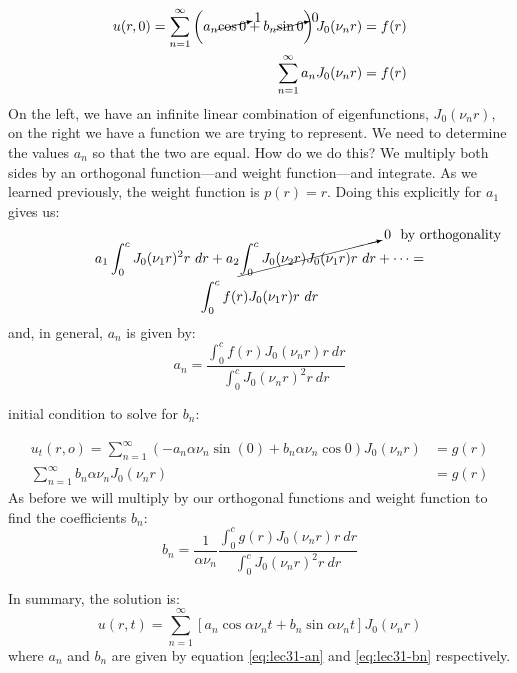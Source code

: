 \begin{align*}
u(r,0) = \sum\limits_{n=1}^{\infty} \left(a_n \cancelto{1}{\cos{0}} + b_n \cancelto{0}{\sin{0}}\right) J_0(\nu_n r) &= f(r) \\
\sum\limits_{n=1}^{\infty}a_nJ_0(\nu_n r) &= f(r)
\end{align*}
On the left, we have an infinite linear combination of eigenfunctions, $J_0(\nu_n r)$, on the right we have a function we are trying to represent.  We need to determine the values $a_n$ so that the two are equal.  How do we do this?  We multiply both sides by an orthogonal function---and weight function---and integrate.  As we learned previously, the weight function is $p(r) = r$.  Doing this explicitly for $a_1$ gives us:
\begin{multline*}
a_1 \int_0^c J_0(\nu_1r)^2 r \ dr + a_2 \cancelto{0 \ \text{ by orthogonality}}{\int_0^c J_0(\nu_2r)J_0(\nu_1 r)r \ dr} + \cdots = \\ \int_0^c f(r)J_0(\nu_1r) r \ dr
\end{multline*}
and, in general, $a_n$ is given by:
\begin{equation}
a_n = \frac{\int_0^c f(r)J_0(\nu_n r) r \ dr}{\int_0^c J_0(\nu_n r)^2 r \ dr}
\label{eq:lec31-an}
\end{equation}

 initial condition to solve for $b_n$:

\begin{align*}
u_t(r,o) = \sum\limits_{n=1}^{\infty}\left(-a_n \alpha \nu_n \sin(0) + b_n \alpha \nu_n \cos{0} \right)J_0(\nu_n r) &= g(r) \\
\sum\limits_{n=1}^{\infty} b_n \alpha \nu_n J_0(\nu_n r) &= g(r)
\end{align*}
As before we will multiply by our orthogonal functions and weight function to find the coefficients $b_n$:
\begin{equation}
b_n = \frac{1}{\alpha \nu_n}\frac{\int_0^c g(r)J_0(\nu_n r) r \ dr}{\int_0^c J_0(\nu_n r)^2 r \ dr}
\label{eq:lec31-bn}
\end{equation}

\vspace{0.25cm}

\noindent In summary, the solution is:
\begin{equation}
u(r,t) = \sum\limits_{n=1}^{\infty} \left[a_n \cos{\alpha \nu_n t} + b_n \sin{\alpha \nu_n t} \right]J_0(\nu_n r)
\end{equation}
where $a_n$ and $b_n$ are given by equation \ref{eq:lec31-an} and \ref{eq:lec31-bn} respectively.

